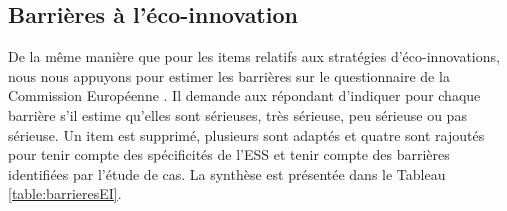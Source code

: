 \subsection{Barrières à l’éco-innovation}

De la même manière que pour les items relatifs aux stratégies d’éco-innovations, nous nous appuyons pour estimer les barrières sur le questionnaire de la Commission Européenne \parencite[cf. ][]{marin2015smes}. Il demande aux répondant d’indiquer pour chaque barrière s’il estime qu’elles sont sérieuses, très sérieuse, peu sérieuse ou pas sérieuse. Un item est supprimé, plusieurs sont adaptés et quatre sont rajoutés pour tenir compte des spécificités de l’ESS et tenir compte des barrières identifiées par l’étude de cas. La synthèse est présentée dans le Tableau \ref{table:barrieresEI}.


